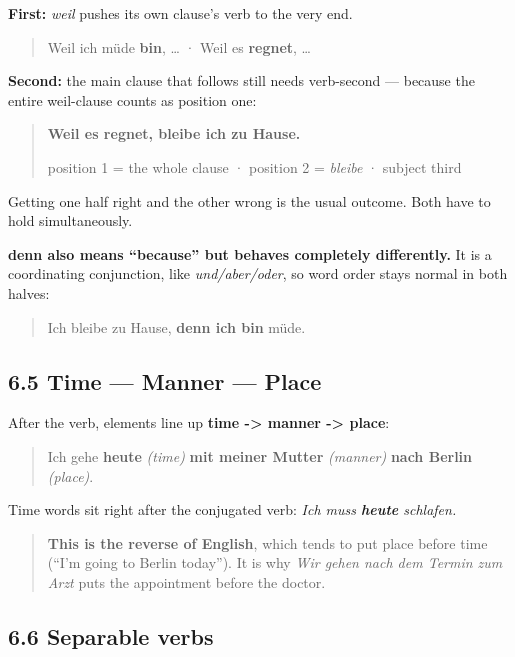 \documentclass[
  11pt,
]{article}
\begin{document}
\textbf{First:} \emph{weil} pushes its own clause's verb to the very
end.

\begin{quote}
Weil ich müde \textbf{bin}, \ldots{} · Weil es \textbf{regnet}, \ldots{}
\end{quote}

\textbf{Second:} the main clause that follows still needs verb-second
--- because the entire weil-clause counts as position one:

\begin{quote}
\textbf{Weil es regnet, bleibe ich zu Hause.}

position 1 = the whole clause · position 2 = \emph{bleibe} · subject
third
\end{quote}

Getting one half right and the other wrong is the usual outcome. Both
have to hold simultaneously.

\textbf{denn also means ``because'' but behaves completely differently.}
It is a coordinating conjunction, like \emph{und/aber/oder}, so word
order stays normal in both halves:

\begin{quote}
Ich bleibe zu Hause, \textbf{denn ich bin} müde.
\end{quote}

\subsection{6.5 Time --- Manner --- Place}\label{time-manner-place}

After the verb, elements line up \textbf{time -\textgreater{} manner
-\textgreater{} place}:

\begin{quote}
Ich gehe \textbf{heute} \emph{(time)} \textbf{mit meiner Mutter}
\emph{(manner)} \textbf{nach Berlin} \emph{(place)}.
\end{quote}

Time words sit right after the conjugated verb: \emph{Ich muss
\textbf{heute} schlafen.}

\begin{quote}
\textbf{This is the reverse of English}, which tends to put place before
time (``I'm going to Berlin today''). It is why \emph{Wir gehen nach dem
Termin zum Arzt} puts the appointment before the doctor.
\end{quote}

\subsection{6.6 Separable verbs}\label{separable-verbs}
\end{document}
